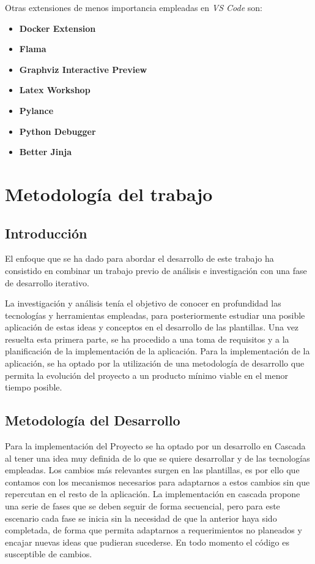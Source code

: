 \documentclass[12pt, a4paper, twoside]{article}
\begin{document}
Otras extensiones de menos importancia empleadas en \textit{VS Code} son:
\begin{itemize}
    \item \textbf{Docker Extension}
    \item \textbf{Flama}
    \item \textbf{Graphviz Interactive Preview}
    \item \textbf{Latex Workshop}
    \item \textbf{Pylance}
    \item \textbf{Python Debugger}
    \item \textbf{Better Jinja}
\end{itemize}














\section{Metodología del trabajo}
\label{sec:Metodologia}
\subsection{Introducción}
El enfoque que se ha dado para abordar el desarrollo de este trabajo ha consistido en combinar un trabajo previo de análisis e investigación con una fase de desarrollo iterativo.

La investigación y análisis tenía el objetivo de conocer en profundidad las tecnologías y herramientas empleadas,
para posteriormente estudiar una posible aplicación de estas ideas y conceptos en el desarrollo de las plantillas.
Una vez resuelta esta primera parte, se ha procedido a una toma de requisitos y a la planificación de la implementación de la aplicación. Para la implementación de la aplicación, se ha optado por la utilización de una metodología de desarrollo que permita la evolución del proyecto a un producto mínimo viable en el menor tiempo posible.
\subsection{Metodología del Desarrollo}
Para la implementación del Proyecto se ha optado por un desarrollo en Cascada al tener una idea muy definida de lo que se quiere desarrollar y de las tecnologías empleadas.
Los cambios más relevantes surgen en las plantillas, es por ello que contamos con los mecanismos necesarios para adaptarnos a estos cambios sin que repercutan en el resto de la aplicación.
La implementación en cascada propone una serie de fases que se deben seguir de forma secuencial, pero para este escenario cada fase se inicia sin la necesidad de que la anterior haya sido completada, de forma que permita adaptarnos a requerimientos no planeados y encajar nuevas ideas que pudieran sucederse. En todo momento el código es susceptible de cambios.
\end{document}
